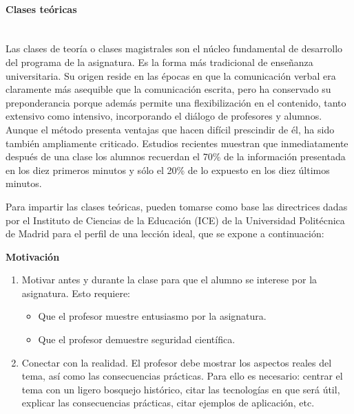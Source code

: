\paragraph{Clases teóricas\\\\}

Las clases de teoría o clases magistrales son el núcleo fundamental de desarrollo del programa de la asignatura. Es la forma más tradicional de enseñanza universitaria. Su origen reside en las épocas en que la comunicación verbal era claramente más asequible que la comunicación escrita, pero ha conservado su preponderancia porque además permite una flexibilización en el contenido, tanto extensivo como intensivo, incorporando el diálogo de profesores y alumnos. Aunque el método presenta ventajas que hacen difícil prescindir de él, ha sido también ampliamente criticado.  Estudios recientes muestran que inmediatamente después de una clase los alumnos recuerdan el 70\% de la información presentada en los diez primeros minutos y sólo el 20\% de lo expuesto en los diez últimos minutos.

Para impartir las clases teóricas, pueden tomarse como base las directrices dadas por el Instituto de Ciencias de la Educación (ICE) de la Universidad Politécnica de Madrid para el perfil de una lección ideal, que se expone a continuación:

\textbf{Motivación}
\begin{enumerate}
\item Motivar antes y durante la clase para que el alumno se interese por la asignatura. Esto requiere:
\begin{itemize}
\item Que el profesor muestre entusiasmo por la asignatura.
\item Que el profesor demuestre seguridad científica.
\end{itemize}
\item Conectar con la realidad. El profesor debe mostrar los aspectos reales del tema, así como las consecuencias prácticas. Para ello es necesario: centrar el tema con un ligero bosquejo histórico, citar las tecnologías en que será útil, explicar las consecuencias prácticas, citar ejemplos de aplicación, etc.
\end{enumerate}

